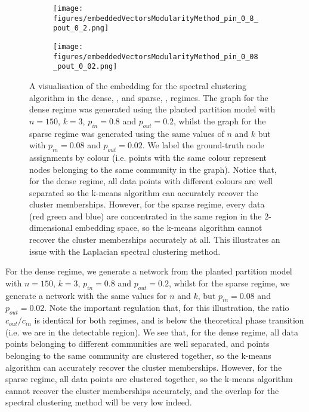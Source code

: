 \begin{figure}
	\centering
	\begin{subfigure}{.5\textwidth}
		\centering
		\texttt{[image: figures/embeddedVectorsModularityMethod\_pin\_0\_8\_pout\_0\_2.png]}
		\caption{}
		\label{fig:spectralClusteringEmbeddingVisualisationPin08}
	\end{subfigure}%
	\begin{subfigure}{.5\textwidth}
		\centering
		\texttt{[image: figures/embeddedVectorsModularityMethod\_pin\_0\_08\_pout\_0\_02.png]}
		\caption{}
		\label{fig:spectralClusteringEmbeddingVisualisationPin008}
	\end{subfigure}
	\caption[Visualisation of spectral clustering embedding in sparse and dense regimes.]{\label{fig:spectralClusteringEmbeddingVisualisationPlots} A visualisation of the embedding for the spectral clustering algorithm in the dense, , and sparse, , regimes. The graph for the dense regime was generated using the planted partition model with $n=150$, $k=3$, $p_{in}=0.8$ and $p_{out}=0.2$, whilst the graph for the sparse regime was generated using the same values of $n$ and $k$ but with $p_{in}=0.08$ and $p_{out}=0.02$. We label the ground-truth node assignments by colour (i.e. points with the same colour represent nodes belonging to the same community in the graph). Notice that, for the dense regime, all data points with different colours are well separated so the k-means algorithm can accurately recover the cluster memberships. However, for the sparse regime, every data (red green and blue) are concentrated in the same region in the 2-dimensional embedding space, so the k-means algorithm cannot recover the cluster memberships accurately at all. This illustrates an issue with the Laplacian spectral clustering method.}
\end{figure}

For the dense regime, we generate a network from the planted partition model with $n=150$, $k=3$, $p_{in}=0.8$ and $p_{out}=0.2$, whilst for the sparse regime, we generate a network with the same values for $n$ and $k$, but $p_{in}=0.08$ and $p_{out}=0.02$.
Note the important regulation that, for this illustration, the ratio $c_{out}/c_{in}$ is identical for both regimes, and is below the theoretical phase transition (i.e. we are in the detectable region).
We see that, for the dense regime, all data points belonging to different communities are well separated, and points belonging to the same community are clustered together, so the k-means algorithm can accurately recover the cluster memberships.
However, for the sparse regime, all data points are clustered together, so the k-means algorithm cannot recover the cluster memberships accurately, and the overlap for the spectral clustering method will be very low indeed.

